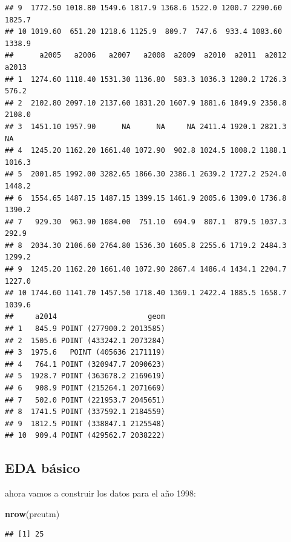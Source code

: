 \documentclass[11pt,]{article}
\newenvironment{Shaded}{\begin{snugshade}}{\end{snugshade}}
\newcommand{\KeywordTok}[1]{\textcolor[rgb]{0.13,0.29,0.53}{\textbf{#1}}}
\newcommand{\OperatorTok}[1]{\textcolor[rgb]{0.81,0.36,0.00}{\textbf{#1}}}
\newcommand{\NormalTok}[1]{#1}
\begin{document}
\begin{verbatim}
## 9  1772.50 1018.80 1549.6 1817.9 1368.6 1522.0 1200.7 2290.60 1825.7
## 10 1019.60  651.20 1218.6 1125.9  809.7  747.6  933.4 1083.60 1338.9
##      a2005   a2006   a2007   a2008  a2009  a2010  a2011  a2012  a2013
## 1  1274.60 1118.40 1531.30 1136.80  583.3 1036.3 1280.2 1726.3  576.2
## 2  2102.80 2097.10 2137.60 1831.20 1607.9 1881.6 1849.9 2350.8 2108.0
## 3  1451.10 1957.90      NA      NA     NA 2411.4 1920.1 2821.3     NA
## 4  1245.20 1162.20 1661.40 1072.90  902.8 1024.5 1008.2 1188.1 1016.3
## 5  2001.85 1992.00 3282.65 1866.30 2386.1 2639.2 1727.2 2524.0 1448.2
## 6  1554.65 1487.15 1487.15 1399.15 1461.9 2005.6 1309.0 1736.8 1390.2
## 7   929.30  963.90 1084.00  751.10  694.9  807.1  879.5 1037.3  292.9
## 8  2034.30 2106.60 2764.80 1536.30 1605.8 2255.6 1719.2 2484.3 1299.2
## 9  1245.20 1162.20 1661.40 1072.90 2867.4 1486.4 1434.1 2204.7 1227.0
## 10 1744.60 1141.70 1457.50 1718.40 1369.1 2422.4 1885.5 1658.7 1039.6
##     a2014                     geom
## 1   845.9 POINT (277900.2 2013585)
## 2  1505.6 POINT (433242.1 2073284)
## 3  1975.6   POINT (405636 2171119)
## 4   764.1 POINT (320947.7 2090623)
## 5  1928.7 POINT (363678.2 2169619)
## 6   908.9 POINT (215264.1 2071669)
## 7   502.0 POINT (221953.7 2045651)
## 8  1741.5 POINT (337592.1 2184559)
## 9  1812.5 POINT (338847.1 2125548)
## 10  909.4 POINT (429562.7 2038222)
\end{verbatim}

\subsection{EDA básico}\label{eda-buxe1sico}

ahora vamos a construir los datos para el año 1998:

\begin{Shaded}
\begin{Highlighting}[]
\KeywordTok{nrow}\NormalTok{(preutm)}
\end{Highlighting}
\end{Shaded}

\begin{verbatim}
## [1] 25
\end{verbatim}

\begin{Shaded}
\end{Shaded}
\end{document}
